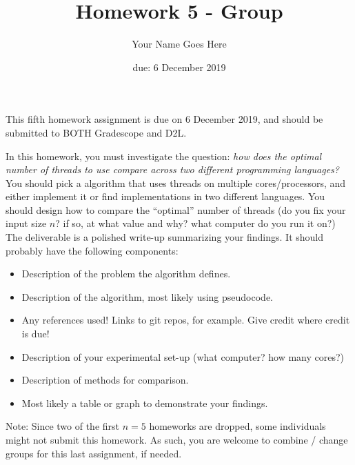 \documentclass{article}
\author{Your Name Goes Here}
\date{due: 6 December 2019}
\title{Homework 5 - Group}
\begin{document}
\maketitle

This fifth homework assignment is due on 6 December 2019, and should be
submitted to BOTH Gradescope and D2L.

In this homework, you must investigate the question: \emph{how does the optimal
number of threads to use compare across two different programming languages?}
You should pick a algorithm that uses threads on multiple cores/processors,
and either implement it or find implementations in
two different languages. You should design how to compare the ``optimal'' number
of threads (do you fix your input size $n$?
if so, at what value and why? what computer do you
run it on?) The deliverable is a polished write-up summarizing your findings.
It should probably have the following components:
\begin{itemize}
\item Description of the problem the algorithm defines.
\item Description of the algorithm, most likely using pseudocode.
\item Any references used! Links to git repos, for example.  Give credit
where credit is due!
\item Description of your experimental set-up (what computer? how many
cores?)
\item Description of methods for comparison.
\item Most likely a table or graph to demonstrate your findings.
\end{itemize}

Note: Since two of the first $n=5$ homeworks are dropped, some individuals might
not submit this homework.  As such, you are welcome to combine / change groups
for this last assignment, if needed.
\end{document}
